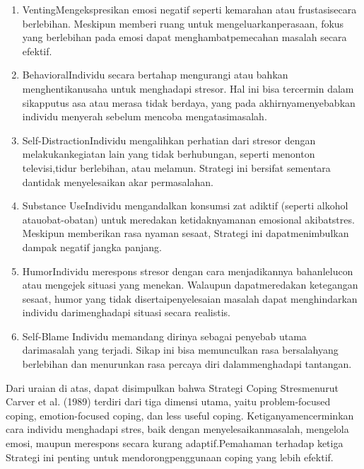 \documentclass[../manperil.tex]{subfiles}
\begin{document}
\begin{enumerate}
	\item VentingMengekspresikan emosi negatif seperti kemarahan atau frustasisecara berlebihan. Meskipun memberi ruang untuk mengeluarkanperasaan, fokus yang berlebihan pada emosi dapat menghambatpemecahan masalah secara efektif.
	\item BehavioralIndividu secara bertahap mengurangi atau bahkan menghentikanusaha untuk menghadapi stresor. Hal ini bisa tercermin dalam sikapputus asa atau merasa tidak berdaya, yang pada akhirnyamenyebabkan individu menyerah sebelum mencoba mengatasimasalah.
	\item Self-DistractionIndividu mengalihkan perhatian dari stresor dengan melakukankegiatan lain yang tidak berhubungan, seperti menonton televisi,tidur berlebihan, atau melamun. Strategi ini bersifat sementara dantidak menyelesaikan akar permasalahan.
	\item Substance UseIndividu mengandalkan konsumsi zat adiktif (seperti alkohol atauobat-obatan) untuk meredakan ketidaknyamanan emosional akibatstres. Meskipun memberikan rasa nyaman sesaat, Strategi ini dapatmenimbulkan dampak negatif jangka panjang.
	\item HumorIndividu merespons stresor dengan cara menjadikannya bahanlelucon atau mengejek situasi yang menekan. Walaupun dapatmeredakan ketegangan sesaat, humor yang tidak disertaipenyelesaian masalah dapat menghindarkan individu darimenghadapi situasi secara realistis.
	\item Self-Blame Individu memandang dirinya sebagai penyebab utama darimasalah yang terjadi. Sikap ini bisa memunculkan rasa bersalahyang berlebihan dan menurunkan rasa percaya diri dalammenghadapi tantangan.
\end{enumerate}

Dari uraian di atas, dapat disimpulkan bahwa Strategi Coping Stresmenurut Carver et al. (1989) terdiri dari tiga dimensi utama, yaitu problem-focused coping, emotion-focused coping, dan less useful coping. Ketiganyamencerminkan cara individu menghadapi stres, baik dengan menyelesaikanmasalah, mengelola emosi, maupun merespons secara kurang adaptif.Pemahaman terhadap ketiga Strategi ini penting untuk mendorongpenggunaan coping yang lebih efektif.
\end{document}
